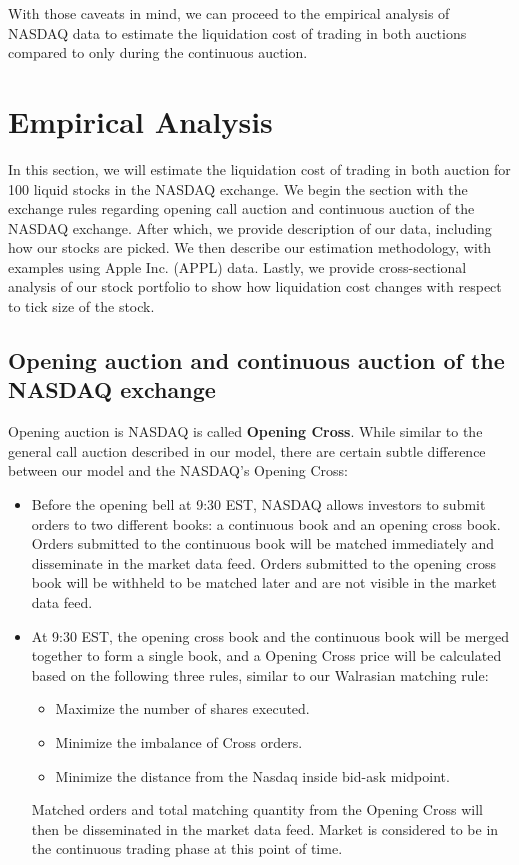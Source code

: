\documentclass{article}
\begin{document}
With those caveats in mind, we can proceed to the empirical analysis of NASDAQ data to estimate the liquidation cost of trading in both auctions compared to only during the continuous auction.

\section{Empirical Analysis}\label{sec:EmpiricalAnalysis}

In this section, we will estimate the liquidation cost of trading in both auction for 100 liquid stocks in the NASDAQ exchange. We begin the section with the exchange rules regarding opening call auction and continuous auction of the NASDAQ exchange. After which, we provide description of our data, including how our stocks are picked. We then describe our estimation methodology, with examples using Apple Inc. (APPL) data. Lastly, we provide cross-sectional analysis of our stock portfolio to show how liquidation cost changes with respect to tick size of the stock.

\subsection{Opening auction and continuous auction of the NASDAQ exchange}

Opening auction is NASDAQ is called \textbf{Opening Cross}. While similar to the general call auction described in our model, there are certain subtle difference between our model and the NASDAQ's Opening Cross:
\begin{itemize}
  \item Before the opening bell at 9:30 EST, NASDAQ allows investors to submit orders to two different books: a continuous book and an opening cross book. Orders submitted to the continuous book will be matched immediately and disseminate in the market data feed. Orders submitted to the opening cross book will be withheld to be matched later and are not visible in the market data feed.
  \item At 9:30 EST, the opening cross book and the continuous book will be merged together to form a single book, and a Opening Cross price will be calculated based on the following three rules, similar to our Walrasian matching rule:
        \begin{itemize}
          \item Maximize the number of shares executed.
          \item Minimize the imbalance of Cross orders.
          \item Minimize the distance from the Nasdaq inside bid-ask midpoint.
        \end{itemize}
        Matched orders and total matching quantity from the Opening Cross will then be disseminated in the market data feed. Market is considered to be in the continuous trading phase at this point of time.
\end{itemize}
\end{document}
